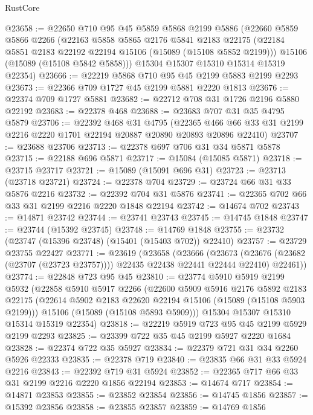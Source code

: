 \begin{lexlean}{RustCore}
\begin{coremodule}
@23658 := @22650
    @710
    @95
    @45
    @5859
    @5868
    @2199
    @5886
    (@22660
      @5859
      @5866
      @2266
      (@22163
        @5858
        @5865
        @2176
        @5841
        @2183
        @22175
        (@22184 @5851 @2183 @22192 @22194 @15106 (@15089 (@15108 @5852 @2199)))
        @15106
        (@15089 (@15108 @5842 @5858)))
      @15304
      @15307
      @15310
      @15314
      @15319
      @22354)
@23666 := @22219 @5868 @710 @95 @45 @2199 @5883 @2199 @2293
@23673 := @22366 @709 @1727 @45 @2199 @5881 @2220 @1813
@23676 := @22374 @709 @1727 @5881
@23682 := @22712 @708 @31 @1726 @2196 @5880 @22192
@23683 := @22378 @468
@23688 := @23683 @707 @31 @35 @4795 @5879
@23706 := @22392
    @468
    @31
    @4795
    (@22365 @466 @66 @33 @31 @2199 @2216 @2220 @1701 @22194 @20887 @20890 @20893 @20896 @22410)
@23707 := @23688 @23706
@23713 := @22378 @697 @706 @31 @34 @5871 @5878
@23715 := @22188 @696 @5871
@23717 := @15084 (@15085 @5871)
@23718 := @23715 @23717
@23721 := @15089 (@15091 @696 @31)
@23723 := @23713 (@23718 @23721)
@23724 := @22378 @704
@23729 := @23724 @66 @31 @33 @5876 @2216
@23732 := @22392 @704 @31 @5876
@23741 := @22365 @702 @66 @33 @31 @2199 @2216 @2220 @1848 @22194
@23742 := @14674 @702
@23743 := @14871 @23742
@23744 := @23741 @23743
@23745 := @14745 @1848
@23747 := @23744 (@15392 @23745)
@23748 := @14769 @1848
@23755 := @23732 (@23747 (@15396 @23748) (@15401 (@15403 @702)) @22410)
@23757 := @23729 @23755 @22427
@23771 := @23619
    (@23658
      (@23666
        (@23673 (@23676 (@23682 (@23707 (@23723 @23757)))) @22435 @22438 @22441 @22444 @22410)
        @22461))
@23774 := @22848 @723 @95 @45
@23810 := @23774
    @5910
    @5919
    @2199
    @5932
    (@22858
      @5910
      @5917
      @2266
      (@22600
        @5909
        @5916
        @2176
        @5892
        @2183
        @22175
        (@22614 @5902 @2183 @22620 @22194 @15106 (@15089 (@15108 @5903 @2199)))
        @15106
        (@15089 (@15108 @5893 @5909)))
      @15304
      @15307
      @15310
      @15314
      @15319
      @22354)
@23818 := @22219 @5919 @723 @95 @45 @2199 @5929 @2199 @2293
@23825 := @23399 @722 @35 @45 @2199 @5927 @2220 @1684
@23828 := @22374 @722 @35 @5927
@23834 := @22379 @721 @31 @34 @2260 @5926 @22333
@23835 := @22378 @719
@23840 := @23835 @66 @31 @33 @5924 @2216
@23843 := @22392 @719 @31 @5924
@23852 := @22365 @717 @66 @33 @31 @2199 @2216 @2220 @1856 @22194
@23853 := @14674 @717
@23854 := @14871 @23853
@23855 := @23852 @23854
@23856 := @14745 @1856
@23857 := @15392 @23856
@23858 := @23855 @23857
@23859 := @14769 @1856

\end{coremodule}
\end{lexlean}
